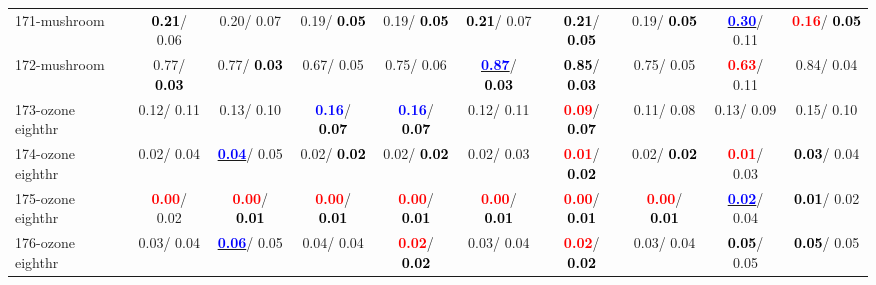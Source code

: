 \begin{table}[h]
\begin{center}
{\begin{tabular}{lc|c|c|c|c|c|c|c|c}
171-mushroom & \textcolor{black}{\textbf{  0.21}}/  0.06 &   0.20/  0.07 &   0.19/\textcolor{black}{\textbf{  0.05}} &   0.19/\textcolor{black}{\textbf{  0.05}} & \textcolor{black}{\textbf{  0.21}}/  0.07 & \textcolor{black}{\textbf{  0.21}}/\textcolor{black}{\textbf{  0.05}} &   0.19/\textcolor{black}{\textbf{  0.05}} & \underline{\textcolor{blue}{\textbf{  0.30}}}/  0.11 & \textcolor{red}{\textbf{  0.16}}/\textcolor{black}{\textbf{  0.05}} \\
172-mushroom &   0.77/\textcolor{black}{\textbf{  0.03}} &   0.77/\textcolor{black}{\textbf{  0.03}} &   0.67/  0.05 &   0.75/  0.06 & \underline{\textcolor{blue}{\textbf{  0.87}}}/\textcolor{black}{\textbf{  0.03}} & \textcolor{black}{\textbf{  0.85}}/\textcolor{black}{\textbf{  0.03}} &   0.75/  0.05 & \textcolor{red}{\textbf{  0.63}}/  0.11 &   0.84/  0.04 \\
173-ozone eighthr &   0.12/  0.11 &   0.13/  0.10 & \textcolor{blue}{\textbf{  0.16}}/\textcolor{black}{\textbf{  0.07}} & \textcolor{blue}{\textbf{  0.16}}/\textcolor{black}{\textbf{  0.07}} &   0.12/  0.11 & \textcolor{red}{\textbf{  0.09}}/\textcolor{black}{\textbf{  0.07}} &   0.11/  0.08 &   0.13/  0.09 &   0.15/  0.10 \\
174-ozone eighthr &   0.02/  0.04 & \underline{\textcolor{blue}{\textbf{  0.04}}}/  0.05 &   0.02/\textcolor{black}{\textbf{  0.02}} &   0.02/\textcolor{black}{\textbf{  0.02}} &   0.02/  0.03 & \textcolor{red}{\textbf{  0.01}}/\textcolor{black}{\textbf{  0.02}} &   0.02/\textcolor{black}{\textbf{  0.02}} & \textcolor{red}{\textbf{  0.01}}/  0.03 & \textcolor{black}{\textbf{  0.03}}/  0.04 \\ \hline
175-ozone eighthr & \textcolor{red}{\textbf{  0.00}}/  0.02 & \textcolor{red}{\textbf{  0.00}}/\textcolor{black}{\textbf{  0.01}} & \textcolor{red}{\textbf{  0.00}}/\textcolor{black}{\textbf{  0.01}} & \textcolor{red}{\textbf{  0.00}}/\textcolor{black}{\textbf{  0.01}} & \textcolor{red}{\textbf{  0.00}}/\textcolor{black}{\textbf{  0.01}} & \textcolor{red}{\textbf{  0.00}}/\textcolor{black}{\textbf{  0.01}} & \textcolor{red}{\textbf{  0.00}}/\textcolor{black}{\textbf{  0.01}} & \underline{\textcolor{blue}{\textbf{  0.02}}}/  0.04 & \textcolor{black}{\textbf{  0.01}}/  0.02 \\
176-ozone eighthr &   0.03/  0.04 & \underline{\textcolor{blue}{\textbf{  0.06}}}/  0.05 &   0.04/  0.04 & \textcolor{red}{\textbf{  0.02}}/\textcolor{black}{\textbf{  0.02}} &   0.03/  0.04 & \textcolor{red}{\textbf{  0.02}}/\textcolor{black}{\textbf{  0.02}} &   0.03/  0.04 & \textcolor{black}{\textbf{  0.05}}/  0.05 & \textcolor{black}{\textbf{  0.05}}/  0.05 \\

\end{tabular}}
\end{center}
\end{table}
